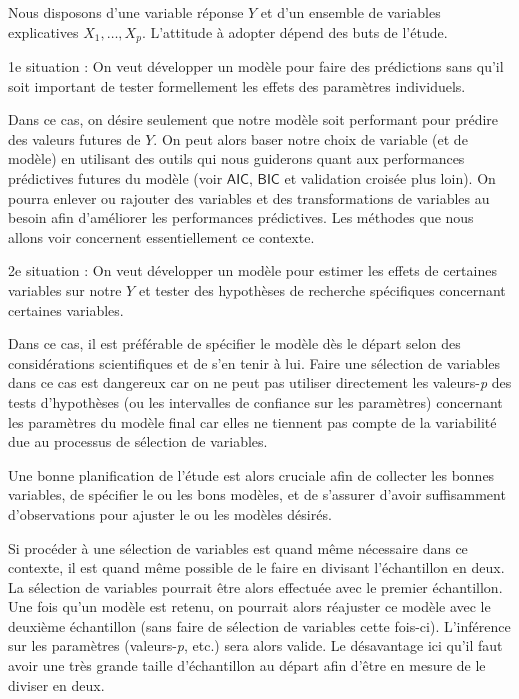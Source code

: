 \documentclass[
  11pt,
  letterpaper,
]{book}
\theoremstyle{definition}
\theoremstyle{definition}
\theoremstyle{definition}
\theoremstyle{remark}
\begin{document}
Nous disposons d'une variable réponse \(Y\) et d'un ensemble de variables explicatives \(X_1, \ldots, X_p\). L'attitude à adopter dépend des buts de l'étude.

1e situation : On veut développer un modèle pour faire des prédictions sans qu'il soit important de tester formellement les effets des paramètres individuels.

Dans ce cas, on désire seulement que notre modèle soit performant pour prédire des valeurs futures de \(Y\). On peut alors baser notre choix de variable (et de modèle) en utilisant des outils qui nous guiderons quant aux performances prédictives futures du modèle (voir \(\mathsf{AIC}\), \(\mathsf{BIC}\) et validation croisée plus loin). On pourra enlever ou rajouter des variables et des transformations de variables au besoin afin d'améliorer les performances prédictives. Les méthodes que nous allons voir concernent essentiellement ce contexte.

2e situation : On veut développer un modèle pour estimer les effets de certaines variables sur notre \(Y\) et tester des hypothèses de recherche spécifiques concernant certaines variables.

Dans ce cas, il est préférable de spécifier le modèle dès le départ selon des considérations scientifiques et de s'en tenir à lui. Faire une sélection de variables dans ce cas est dangereux car on ne peut pas utiliser directement les valeurs-\emph{p} des tests d'hypothèses (ou les intervalles de confiance sur les paramètres) concernant les paramètres du modèle final car elles ne tiennent pas compte de la variabilité due au processus de sélection de variables.

Une bonne planification de l'étude est alors cruciale afin de collecter les bonnes variables, de spécifier le ou les bons modèles, et de s'assurer d'avoir suffisamment d'observations pour ajuster le ou les modèles désirés.

Si procéder à une sélection de variables est quand même nécessaire dans ce contexte, il est quand même possible de le faire en divisant l'échantillon en deux. La sélection de variables pourrait être alors effectuée avec le premier échantillon. Une fois qu'un modèle est retenu, on pourrait alors réajuster ce modèle avec le deuxième échantillon (sans faire de sélection de variables cette fois-ci). L'inférence sur les paramètres (valeurs-\emph{p}, etc.) sera alors valide. Le désavantage ici qu'il faut avoir une très grande taille d'échantillon au départ afin d'être en mesure de le diviser en deux.
\end{document}
